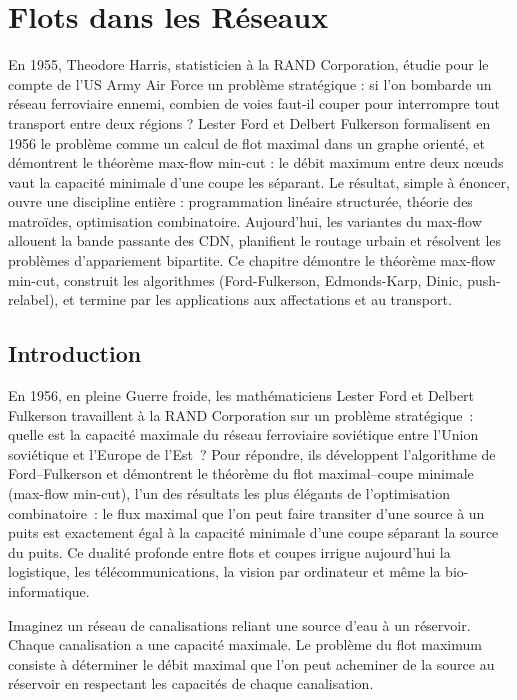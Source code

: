 \chapter{Flots dans les R\'eseaux}
\label{ch:flots}

En 1955, Theodore Harris, statisticien à la RAND Corporation, étudie pour le compte de l'US Army Air Force un problème stratégique : si l'on bombarde un réseau ferroviaire ennemi, combien de voies faut-il couper pour interrompre tout transport entre deux régions ? Lester Ford et Delbert Fulkerson formalisent en 1956 le problème comme un calcul de flot maximal dans un graphe orienté, et démontrent le théorème max-flow min-cut : le débit maximum entre deux nœuds vaut la capacité minimale d'une coupe les séparant. Le résultat, simple à énoncer, ouvre une discipline entière : programmation linéaire structurée, théorie des matroïdes, optimisation combinatoire. Aujourd'hui, les variantes du max-flow allouent la bande passante des CDN, planifient le routage urbain et résolvent les problèmes d'appariement bipartite. Ce chapitre démontre le théorème max-flow min-cut, construit les algorithmes (Ford-Fulkerson, Edmonds-Karp, Dinic, push-relabel), et termine par les applications aux affectations et au transport.

\section{Introduction}

En 1956, en pleine Guerre froide, les math\'ematiciens Lester Ford et Delbert Fulkerson travaillent \`a la RAND Corporation sur un probl\`eme strat\'egique~: quelle est la capacit\'e maximale du r\'eseau ferroviaire sovi\'etique entre l'Union sovi\'etique et l'Europe de l'Est~? Pour r\'epondre, ils d\'eveloppent l'algorithme de Ford--Fulkerson et d\'emontrent le th\'eor\`eme du flot maximal--coupe minimale (max-flow min-cut), l'un des r\'esultats les plus \'el\'egants de l'optimisation combinatoire~: le flux maximal que l'on peut faire transiter d'une source \`a un puits est exactement \'egal \`a la capacit\'e minimale d'une coupe s\'eparant la source du puits. Ce dualit\'e profonde entre flots et coupes irrigue aujourd'hui la logistique, les t\'el\'ecommunications, la vision par ordinateur et m\^eme la bio-informatique.

\begin{intuition}
Imaginez un r\'eseau de canalisations reliant une source d'eau \`a un r\'eservoir.
Chaque canalisation a une capacit\'e maximale. Le probl\`eme du flot maximum
consiste \`a d\'eterminer le d\'ebit maximal que l'on peut acheminer de la source
au r\'eservoir en respectant les capacit\'es de chaque canalisation.
\end{intuition}


